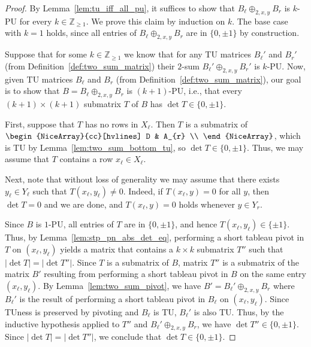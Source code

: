 \begin{proof}
    By Lemma~\ref{lem:tu_iff_all_pu}, it suffices to show that $B_{\ell} \oplus_{2, x, y} B_{r}$ is $k$-PU for every $k \in \mathbb{Z}_{\geq 1}$. We prove this claim by induction on $k$. The base case with $k = 1$ holds, since all entries of $B_{\ell} \oplus_{2, x, y} B_{r}$ are in $\{0, \pm 1\}$ by construction.

    Suppose that for some $k \in \mathbb{Z}_{\geq 1}$ we know that for any TU matrices $B_{\ell}'$ and $B_{r}'$ (from Definition~\ref{def:two_sum_matrix}) their $2$-sum $B_{\ell}' \oplus_{2, x, y} B_{r}'$ is $k$-PU. Now, given TU matrices $B_{\ell}$ and $B_{r}$ (from Definition~\ref{def:two_sum_matrix}), our goal is to show that $B = B_{\ell} \oplus_{2, x, y} B_{r}$ is $(k + 1)$-PU, i.e., that every $(k + 1) \times (k + 1)$ submatrix $T$ of $B$ has $\det T \in \{0, \pm 1\}$.

    First, suppose that $T$ has no rows in $X_{\ell}$. Then $T$ is a submatrix of $\begin{NiceArray}{cc}[hvlines] D & A_{r} \\ \end{NiceArray}$, which is TU by Lemma~\ref{lem:two_sum_bottom_tu}, so $\det T \in \{0, \pm 1\}$. Thus, we may assume that $T$ contains a row $x_{\ell} \in X_{\ell}$.

    Next, note that without loss of generality we may assume that there exists $y_{\ell} \in Y_{\ell}$ such that $T (x_{\ell}, y_{\ell}) \neq 0$. Indeed, if $T (x_{\ell}, y) = 0$ for all $y$, then $\det T = 0$ and we are done, and $T (x_{\ell}, y) = 0$ holds whenever $y \in Y_{r}$.

    Since $B$ is $1$-PU, all entries of $T$ are in $\{0, \pm 1\}$, and hence $T (x_{\ell}, y_{\ell}) \in \{\pm 1\}$. Thus, by Lemma~\ref{lem:stp_pn_abs_det_eq}, performing a short tableau pivot in $T$ on $(x_{\ell}, y_{\ell})$ yields a matrix that contains a $k \times k$ submatrix $T''$ such that $|\det T| = |\det T''|$. Since $T$ is a submatrix of $B$, matrix $T''$ is a submatrix of the matrix $B'$ resulting from performing a short tableau pivot in $B$ on the same entry $(x_{\ell}, y_{\ell})$. By Lemma~\ref{lem:two_sum_pivot}, we have $B' = B_{\ell}' \oplus_{2, x, y} B_{r}$ where $B_{\ell}'$ is the result of performing a short tableau pivot in $B_{\ell}$ on $(x_{\ell}, y_{\ell})$. Since TUness is preserved by pivoting and $B_{\ell}$ is TU, $B_{\ell}'$ is also TU. Thus, by the inductive hypothesis applied to $T''$ and $B_{\ell}' \oplus_{2, x, y} B_{r}$, we have $\det T'' \in \{0, \pm 1\}$. Since $|\det T| = |\det T''|$, we conclude that $\det T \in \{0, \pm 1\}$.
\end{proof}

